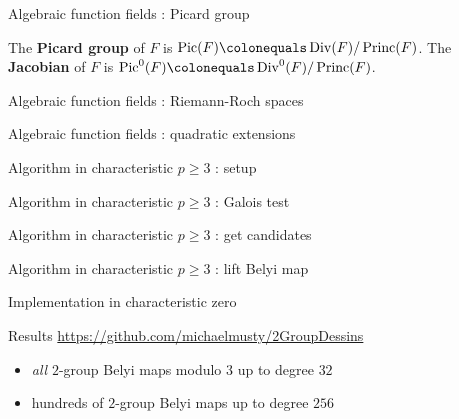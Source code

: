 \documentclass[xcolor=dvipsnames]{beamer}
\theoremstyle{plain}
\DeclareMathOperator{\Div}{Div}
\DeclareMathOperator{\Princ}{Princ}
\DeclareMathOperator{\Pic}{Pic}
\begin{document}
{\begin{frame}{Algebraic function fields : Picard group}
      \pause\par
      The \textbf{Picard group} of $F$ is
      $\Pic(F)\colonequals\Div(F)/\Princ(F)$.
      \newline
      The \textbf{Jacobian} of $F$ is
      $\Pic^0(F)\colonequals\Div^0(F)/\Princ(F)$.
    \end{frame}
    \begin{frame}{Algebraic function fields : Riemann-Roch spaces}
    \end{frame}
    \begin{frame}{Algebraic function fields : quadratic extensions}
    \end{frame}
    \begin{frame}{Algorithm in characteristic $p\geq 3$ : setup}
    \end{frame}
    \begin{frame}{Algorithm in characteristic $p\geq 3$ : Galois test}
    \end{frame}
    \begin{frame}{Algorithm in characteristic $p\geq 3$ : get candidates}
    \end{frame}
    \begin{frame}{Algorithm in characteristic $p\geq 3$ : lift Belyi map}
    \end{frame}
    \begin{frame}{Implementation in characteristic zero}
    \end{frame}
    \begin{frame}{Results}
        \url{https://github.com/michaelmusty/2GroupDessins}
      \begin{itemize}
        \item
          \emph{all} $2$-group Belyi maps modulo $3$ up to degree $32$
        \item
          hundreds of $2$-group Belyi maps up to degree $256$
      \end{itemize}
    \end{frame}
  }
\end{document}
